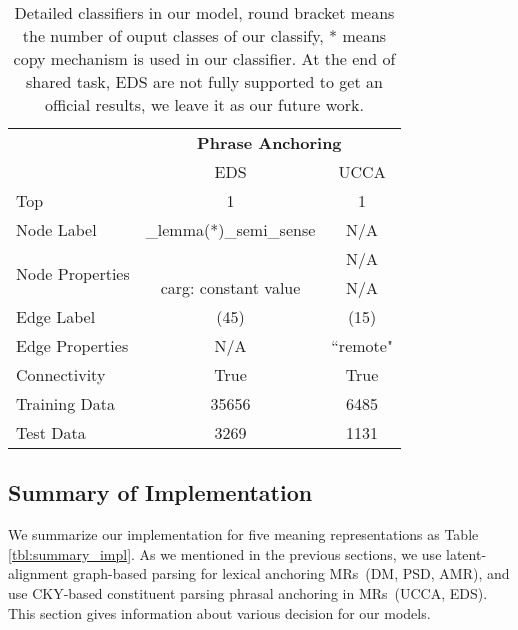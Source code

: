 \begin{table}[!ht]
\begin{center}
\small
\begin{tabular}{l|cc}
\toprule
\hline
                                 & \multicolumn{2}{c}{{\bf Phrase Anchoring}} \\ \cline{2-3}
                                 & EDS                     & UCCA             \\ \hline
Top                              & 1                       & 1                \\ \hline
Node Label                       & \_lemma(*)\_semi\_sense & N/A              \\ \hline
\multirow{2}{*}{Node Properties} &                         & N/A              \\
                                 & carg: constant value    & N/A              \\ \hline
Edge Label                       & (45)                    & (15)             \\ \hline
Edge Properties                  & N/A                     & ``remote"        \\ \hline
Connectivity                     & True                    & True             \\ \hline
Training Data                    & 35656                   & 6485             \\ \hline
Test Data                        & 3269                    & 1131             \\ \hline \bottomrule
\end{tabular}
\end{center}
\caption{Detailed classifiers in our model, round bracket means the
  number of ouput classes of our classify, * means copy mechanism is
  used in our classifier. At the end of shared task, EDS are not fully supported to get an official results, we leave it as our future work.}
\label{tbl:phr:impl_phrasal}
\end{table}

\subsection{Summary of Implementation}
\label{ssec:impl_summary}

We summarize our implementation for five meaning representations as
Table \ref{tbl:summary_impl}. As we mentioned in the previous
sections, we use latent-alignment graph-based parsing for lexical
anchoring MRs~(DM, PSD, AMR), and use CKY-based constituent parsing
phrasal anchoring in MRs~(UCCA, EDS). This section gives information
about various decision for our models.

